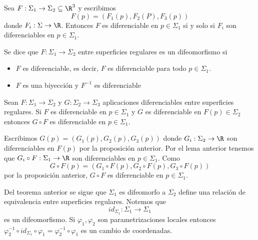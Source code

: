 \documentclass{article}
\begin{document}
\begin{prop}
    Sea $F:\Sigma_{1}\to\Sigma_{2}\subseteq\R^{3}$ y escribimos
    \begin{equation*}
        F(p)=(F_{1}(p),F_{2}(P),F_{3}(p))
    \end{equation*}
    donde $F_{i}:\Sigma\to\R$. Entonces $F$ es diferenciable en $p\in\Sigma_{1}$ si y solo si 
    $F_{i}$ son diferenciables en $p\in\Sigma_{1}$.
\end{prop}

\begin{dfn}
    Se dice que $F:\Sigma_{1}\to\Sigma_{2}$ entre superficies regulares es un difeomorfismo si
    \begin{itemize}
        \item $F$ es diferenciable, es decir, $F$ es diferenciable para todo $p\in\Sigma_{1}$.
        \item $F$ es una biyección y $F^{-1}$ es diferenciable
    \end{itemize}
\end{dfn}

\begin{teo}
    Sean $F:\Sigma_{1}\to\Sigma_{2}$ y $G:\Sigma_{2}\to\Sigma_{3}$ aplicaciones diferenciables entre
    superficies regulares. Si $F$ es diferenciable en $p\in\Sigma_{1}$ y $G$ es diferenciable en
    $F(p)\in\Sigma_{2}$ entonces $G\circ F$ es diferenciable en $p\in\Sigma_{1}$.
\end{teo}

\begin{dem}
    Escribimos $G(p)=(G_{1}(p),G_{2}(p),G_{3}(p))$ donde $G_{i}:\Sigma_{2}\to\R$ son diferenciables 
    en $F(p)$ por la proposición anterior. Por el lema anterior tenemos que 
    $G_{i}\circ F:\Sigma_{1}\to\R$ son diferenciables en $p\in\Sigma_{1}$.
    Como
    \begin{equation*}
        G\circ F(p)=(G_{1}\circ F(p),G_{2}\circ F(p),G_{3}\circ F(p))
    \end{equation*}
    por la proposición anterior, $G\circ F$ es diferenciable en $p\in\Sigma_{1}$.
\end{dem}

\noindent Del teorema anterior se sigue que $\Sigma_{1}$ es difeomorfo a $\Sigma_{2}$ define una 
relación de equivalencia entre superficies regulares. Notemos que
\begin{equation*}
    id_{\Sigma_{1}}:\Sigma_{1}\to\Sigma_{1}
\end{equation*}
es un difeomorfismo. Si $\varphi_{1},\varphi_{2}$ son parametrizaciones locales entonces 
$\varphi_{2}^{-1}\circ id_{\Sigma_{1}}\circ\varphi_{1}=\varphi_{2}^{-1}\circ\varphi_{1}$ es un
cambio de coordenadas.
\vspace{4mm}
\end{document}
